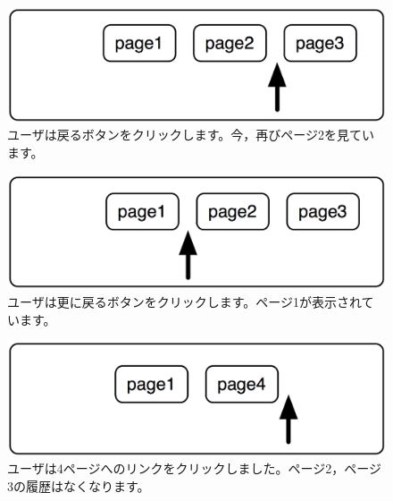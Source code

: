 \documentclass[a4paper,10pt,twoside]{book}
\begin{document}
\begin{figure}[!ht]
\centerline{\includegraphics[scale=0.5]{page2_Stef}}
\caption{ユーザは戻るボタンをクリックします。今，再びページ2を見ています。}
\vspace{.2in}
\end{figure}

\begin{figure}[!ht]
\centerline{\includegraphics[scale=0.5]{page1_Stef}}
\caption{ユーザは更に戻るボタンをクリックします。ページ1が表示されています。}
\vspace{.2in}
\end{figure}

\begin{figure}[!ht]
\centerline{\includegraphics[scale=0.5]{page4Stef}}
\caption{ユーザは4ページへのリンクをクリックしました。ページ2，ページ3の履歴はなくなります。}
\vspace{.2in}
\end{figure}
\end{document}
